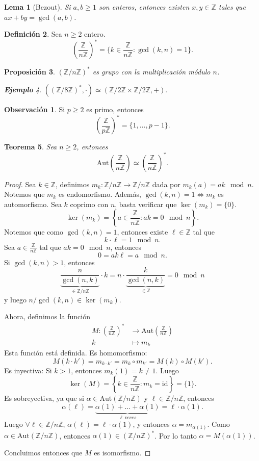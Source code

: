 \documentclass{article}
\newtheorem{theorem}{Teorema}[subsection]
\newtheorem{proposition}[theorem]{Proposición}
\newtheorem{lemma}[theorem]{Lema}
\theoremstyle{definition}
\newtheorem{definition}[theorem]{Definición}
\newtheorem*{obs}{Observación}
\theoremstyle{remark}
\newtheorem{example}[theorem]{\textbf{Ejemplo}}
\numberwithin{equation}{section}
\newcommand{\Z}{\mathbb{Z}}
\renewcommand{\a}{\alpha}
\renewcommand{\c}{\cdot}
\newcommand{\id}{\mathrm{id}}
\newcommand{\Aut}{\mathrm{Aut}}
\newcommand{\br}[1]{\left( #1 \right)}
\newcommand{\set}[1]{\left\{ #1 \right\}}
\newcommand{\znz}[1]{\frac{\Z}{#1 \Z}}
\newcommand{\zmz}[1]{\Z/ #1 \Z}
\begin{document}
\begin{lemma}[Bezout]
  Si $a,b \geq 1$ son enteros, entonces existen $x,y \in \Z$ tales que $ax+by = \gcd(a,b)$.
\end{lemma}

\begin{definition}
  Sea $n \geq 2$ entero. 
  \[ \br{\znz n}^* = \{k \in \znz n \colon \gcd(k,n) = 1\}. \]
\end{definition}

\begin{proposition}
  $(\zmz n)^*$ es grupo con la multiplicación módulo $n$.
\end{proposition}

\begin{example}
  $((\zmz8)^*, \c) \simeq (\zmz2 \times \zmz2, +)$.
\end{example}

\begin{obs}
  Si $p \geq 2$ es primo, entonces 
  \[ \br{\znz p}^* = \{1,\dots, p-1\}. \]
\end{obs}

\begin{theorem}
  Sea $n \geq 2$, entonces 
  \[ \Aut\br{\znz n} \simeq \br{\znz n}^*. \]
\end{theorem}
\begin{proof}
  Sea $k \in \Z$, definimos $m_k \colon \zmz n \to \zmz n$ dada por $m_k(a) = ak \mod n$.
  Notemos que $m_k$ es endomorfismo. Además, $\gcd(k,n) = 1 \iff m_k$ es automorfismo.
  Sea $k$ coprimo con $n$, basta verificar que $\ker(m_k) = \{0\}$. 
  \[ \ker(m_k) = \set{a \in \znz n \colon ak = 0 \mod n}. \]
  Notemos que como $\gcd(k,n) = 1$, entonces existe $\ell \in \Z$ tal que $$k \c \ell = 1 \mod n.$$
  Sea $a \in \znz n$ tal que $ak = 0 \mod n$, entonces
  \[ 0 = ak \ell = a \mod n. \]
  Si $\gcd(k,n) > 1$, entonces 
  \[ \underbrace{\frac{n}{\gcd(n,k)}}_{\in \zmz n} \c k = n \c \underbrace{\frac{k}{\gcd(n,k)}}_{\in \Z} = 0 \mod n \]
  y luego $n/\gcd(k,n) \in \ker(m_k)$.

  Ahora, definimos la función 
  \begin{align*}
      M \colon \br{\znz n}^* &\to \Aut\br{\znz n} \\ 
      k &\mapsto m_k
  \end{align*}
  Esta función está definida. Es homomorfismo: 
  \[ M(k \c k') = m_{k \c k'} = m_k \circ m_{k'} = M(k) \circ M(k'). \]
  Es inyectiva: Si $k >1$, entonces $m_k(1) = k \neq 1$. Luego 
  \[ \ker(M) = \set{k \in \znz n \colon m_k = \id} = \{1\}. \]
  Es sobreyectiva, ya que si $\a \in \Aut(\zmz n)$ y $\ell \in \zmz n$, entonces 
  \[ \a(\ell) = \underbrace{\a(1) + \dots + \a(1)}_{\ell \ veces} = \ell \c \a(1). \]
  Luego $\forall \ell \in \zmz n$, $\a(\ell) = \ell \c \a(1)$, y entonces $\a = m_{\a(1)}$. Como $\a \in \Aut(\zmz n)$, entonces $\a(1) \in (\zmz n)^*$. Por lo tanto $\a = M(\a(1))$.

  Concluimos entonces que $M$ es isomorfismo.
\end{proof}
\end{document}

